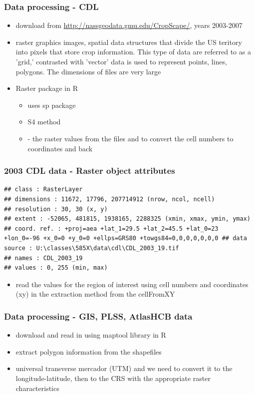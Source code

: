 \documentclass[xcolor=pdftex,dvipsnames,table]{beamer}
\begin{document}
\begin{frame}
\frametitle{Data processing - CDL}


\begin{itemize}
\item download from \href {CDL} {http://nassgeodata.gmu.edu/CropScape/}, years 2003-2007
\item raster graphics images, spatial data
structures that divide the US teritory into pixels that store crop information. This type of data are
referred to as a ’grid,’ contrasted with ’vector’ data is used to represent points, lines, polygons. The
dimensions of files are very large
\item Raster package in R 
       \begin{itemize}
      \item uses sp package
      \item S4 method
       \item - the raster values from the files and to convert the cell numbers to coordinates and back
      \end{itemize}
\end{itemize}
\end{frame}

\begin{frame}
\frametitle{2003 CDL data - Raster object attributes}
\begin{verbatim}
## class : RasterLayer
## dimensions : 11672, 17796, 207714912 (nrow, ncol, ncell)
## resolution : 30, 30 (x, y)
## extent : -52065, 481815, 1938165, 2288325 (xmin, xmax, ymin, ymax)
## coord. ref. : +proj=aea +lat_1=29.5 +lat_2=45.5 +lat_0=23 +lon_0=-96 +x_0=0 +y_0=0 +ellps=GRS80 +towgs84=0,0,0,0,0,0,0 ## data source : U:\classes\585X\data\cdl\CDL_2003_19.tif
## names : CDL_2003_19
## values : 0, 255 (min, max)

\end{verbatim}

\begin{itemize}
\item read the values for the region of interest using cell numbers and coordinates (xy) in the extraction method from the cellFromXY
\end{itemize}

\end{frame}

\begin{frame}
\frametitle{Data processing - GIS, PLSS, AtlasHCB data}

\begin{itemize}
\item download and read in using maptool library in R
\item extract polygon information from the shapefiles
\item universal transverse
mercador (UTM) and we need to convert it to the longitude-latitude, then to the CRS with the
appropriate raster characteristics
\end{itemize}
\end{frame}
\end{document}
